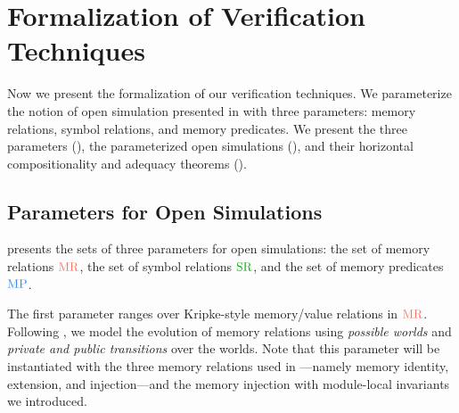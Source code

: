 \section{Formalization of Verification Techniques}
\label{sec:main-verification}


Now we present the formalization of our verification techniques.
We parameterize the notion of open simulation presented in
 with three parameters: memory relations, symbol
relations, and memory predicates.  We present the three parameters
(), the parameterized open simulations
(), and their horizontal compositionality and adequacy theorems
().

\subsection{Parameters for Open Simulations}
\label{sec:main-verification:parameter}

 presents
the sets of three parameters for open simulations:
the set of memory relations $\MREL$, the set of symbol relations $\SREL$, and the set of memory predicates $\MPRED$.




The first parameter ranges over Kripke-style memory/value relations in $\MREL$.
Following \cite{DBLP:conf/icfp/DreyerNB10,pb}, we model the
evolution of memory relations using \emph{possible worlds} and \emph{private and public transitions}
over the worlds.
Note that this parameter will be instantiated with the three memory relations used in \cc{}---namely memory
identity, extension, and injection---and the memory injection with module-local invariants we introduced.


